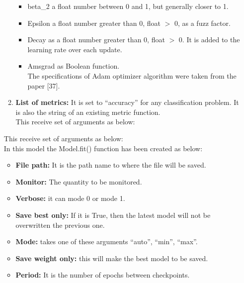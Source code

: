\begin{itemize}
\begin{enumerate}
\begin{itemize}
            \item beta\_2 a float number between 0 and 1, but generally closer to 1.
            \item Epsilon a float number greater than 0, float $>$ 0, as a fuzz factor.
            \item Decay as a float number greater than 0, float $>$ 0. It is added to the learning rate over each update.
            \item Amsgrad as Boolean function.\\
            The specifications of Adam optimizer algorithm were taken from the paper [37].
        \end{itemize}
        \item \textbf{List of metrics:} It is set to “accuracy” for any classification problem. It is also the string of an existing metric function.\\
        This receive set of arguments as below:
    \end{enumerate}
    This receive set of arguments as below:\\
    \noindent{}
 In this model the Model.fit() function has been created as below:
\begin{itemize}
    \item \textbf{File path:} It is the path name to where the file will be saved.
    \item \textbf{Monitor:} The quantity to be monitored.
    \item \textbf{Verbose:} it can mode 0 or mode 1.
    \item \textbf{Save best only:} If it is True, then the latest model will not be overwritten the previous one.
    \item \textbf{Mode:} takes one of these arguments “auto”, “min”, “max”.
    \item \textbf{Save weight only:} this will make the best model to be saved.
    \item \textbf{Period:} It is the number of epochs between checkpoints.

\end{itemize}
\end{itemize}
